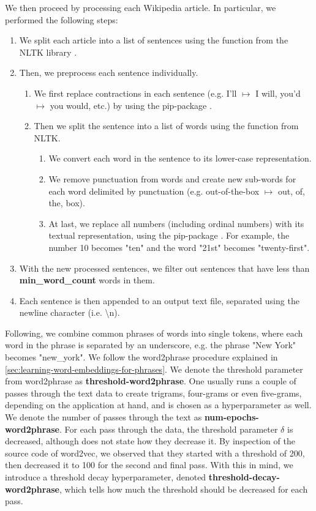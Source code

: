 We then proceed by processing each Wikipedia article. In particular, we performed the following steps:
\begin{enumerate}
    \item We split each article into a list of sentences using the  function from the NLTK library \cite{bird2009natural}.
    \item Then, we preprocess each sentence individually.
    \begin{enumerate}
        \item We first replace contractions in each sentence (e.g. I'll $\mapsto$ I will, you'd $\mapsto$ you would, etc.) by using the  pip-package \cite{contractions-2016}.
        \item Then we split the sentence into a list of words using the  function from NLTK.
        \begin{enumerate}
            \item We convert each word in the sentence to its lower-case representation.
            \item We remove punctuation from words and create new sub-words for each word delimited by punctuation (e.g. out-of-the-box $\mapsto$ out, of, the, box).
            \item At last, we replace all numbers (including ordinal numbers) with its textual representation, using the  pip-package \cite{num2words2014}. For example, the number 10 becomes "ten" and the word "21st" becomes "twenty-first".
        \end{enumerate}
    \end{enumerate}
    \item With the new processed sentences, we filter out sentences that have less than \textbf{min\_word\_count} words in them.
    \item Each sentence is then appended to an output text file, separated using the newline character (i.e. \textbackslash n).
\end{enumerate}

Following, we combine common phrases of words into single tokens, where each word in the phrase is separated by an underscore, e.g. the phrase "New York" becomes "new\_york". We follow the word2phrase procedure explained in \cref{sec:learning-word-embeddings-for-phrases}. We denote the threshold parameter from word2phrase as \textbf{threshold-word2phrase}. One usually runs a couple of passes through the text data to create trigrams, four-grams or even five-grams, depending on the application at hand, and is chosen as a hyperparameter as well. We denote the number of passes through the text as \textbf{num-epochs-word2phrase}. For each pass through the data, the threshold parameter $\delta$ is decreased, although \cite{mikolov2013b} does not state how they decrease it. By inspection of the source code of word2vec, we observed that they started with a threshold of 200, then decreased it to 100 for the second and final pass. With this in mind, we introduce a threshold decay hyperparameter, denoted \textbf{threshold-decay-word2phrase}, which tells how much the threshold should be decreased for each pass.

